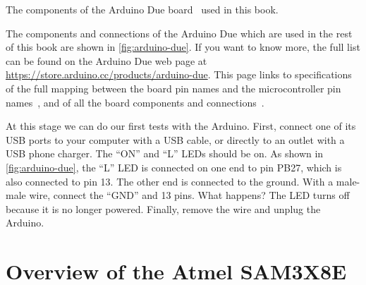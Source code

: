 \begin{Figure}
  

  \caption{The components of the Arduino Due
    board~\cite{ArduinoDueFullPinout,ArduinoDueSchematics} used in this
    book.}\label{fig:arduino-due}
\end{Figure}

The components and connections of the Arduino Due which are used in the rest of
this book are shown in \cref{fig:arduino-due}. If you want to know more, the
full list can be found on the Arduino Due web page at
\url{https://store.arduino.cc/products/arduino-due}. This page links to
specifications of the full mapping between the board pin names and the
microcontroller pin names~\cite{ArduinoDueFullPinout}, and of all the board
components and connections~\cite{ArduinoDueSchematics}.

At this stage we can do our first tests with the Arduino. First, connect one of
its USB ports to your computer with a USB cable, or directly to an outlet with
a USB phone charger. The ``ON'' and ``L'' LEDs should be on. As shown in
\cref{fig:arduino-due}, the ``L'' LED is connected on one end to pin PB27,
which is also connected to pin 13. The other end is connected to the ground.
With a male-male wire, connect the ``GND'' and 13 pins. What happens? The LED
turns off because it is no longer powered. Finally, remove the wire and unplug
the Arduino.

\section{Overview of the Atmel SAM3X8E}\label{section:overview-sam3x8e}

